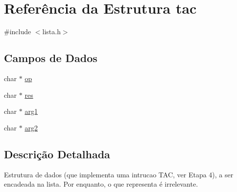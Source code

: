 \hypertarget{structtac}{
\section{Referência da Estrutura tac}
\label{structtac}
}


{\ttfamily \#include $<$lista.h$>$}\subsection*{Campos de Dados}
\begin{DoxyCompactItemize}
\item 
char $\ast$ \hyperlink{structtac_a95f9c50b359afc15df11bdbf029651d7}{op}
\item 
char $\ast$ \hyperlink{structtac_ab9916cad43f718ed7a316e94ce80bab1}{res}
\item 
char $\ast$ \hyperlink{structtac_a473f301b4f09061170fd4042cec395cf}{arg1}
\item 
char $\ast$ \hyperlink{structtac_a6fb90118ff84ebfb171852afd4a31a37}{arg2}
\end{DoxyCompactItemize}


\subsection{Descrição Detalhada}
Estrutura de dados (que implementa uma intrucao TAC, ver Etapa 4), a ser encadeada na lista. Por enquanto, o que representa é irrelevante. 

